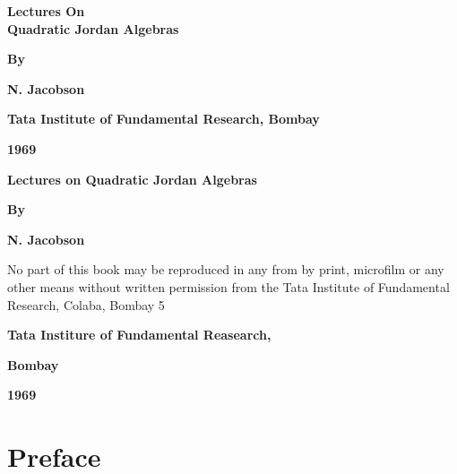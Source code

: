 
\thispagestyle{empty}

\begin{center}
{\Large\bf Lectures On}\\[5pt] 
{\Large\bf Quadratic Jordan Algebras}
\vfill

{\bf  By}
\medskip

{\large\bf  N. Jacobson}
\vfill

{\bf Tata Institute of Fundamental Research, Bombay}

{\bf  1969}
\end{center}

\eject

\thispagestyle{empty}
\begin{center}
{\Large\bf Lectures on Quadratic Jordan Algebras}
\vfill



{\bf  By}
\medskip

{\large\bf  N. Jacobson}
\vfill



\parbox{0.7\textwidth}{No part of this book may be reproduced in any from by print,
microfilm or any other means without written permission from the
Tata Institute of Fundamental Research, Colaba, Bombay 5}
\vfill

{\bf  Tata Institure of Fundamental Reasearch,}

{\bf  Bombay}

{\bf  1969}
\end{center}



\chapter{Preface}

